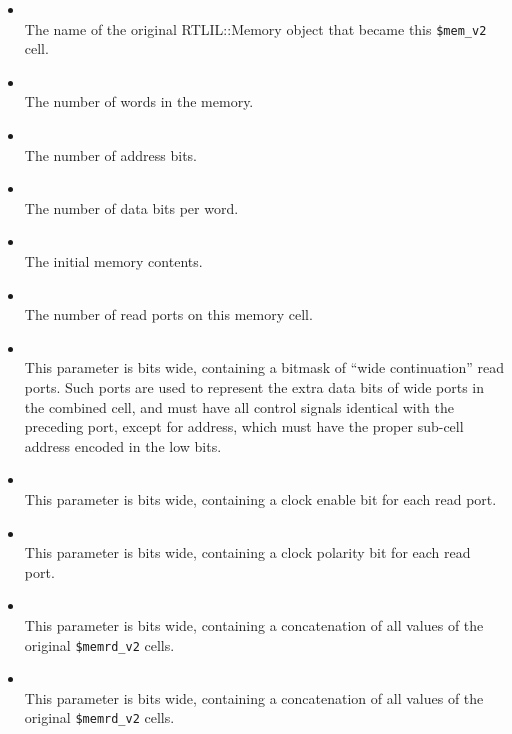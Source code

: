 \begin{itemize}
\item {} \\
The name of the original RTLIL::Memory object that became this {\tt \$mem\_v2} cell.

\item {} \\
The number of words in the memory.

\item {} \\
The number of address bits.

\item {} \\
The number of data bits per word.

\item {} \\
The initial memory contents.

\item {} \\
The number of read ports on this memory cell.

\item {} \\
This parameter is  bits wide, containing a bitmask of ``wide continuation'' read ports.
Such ports are used to represent the extra data bits of wide ports in the combined cell, and must
have all control signals identical with the preceding port, except for address, which must have
the proper sub-cell address encoded in the low bits.

\item {} \\
This parameter is  bits wide, containing a clock enable bit for each read port.

\item {} \\
This parameter is  bits wide, containing a clock polarity bit for each read port.

\item {} \\
This parameter is  bits wide, containing a concatenation of all
 values of the original {\tt \$memrd\_v2} cells.

\item {} \\
This parameter is  bits wide, containing a concatenation of all
 values of the original {\tt \$memrd\_v2} cells.


\end{itemize}
